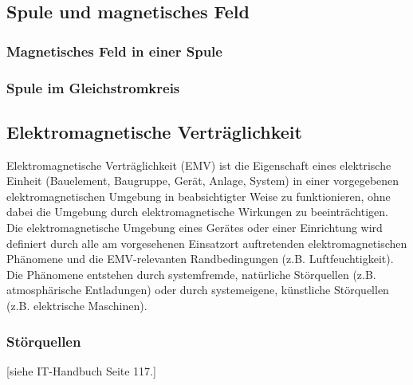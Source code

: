 \subsection{Spule und magnetisches Feld}
\subsubsection{Magnetisches Feld in einer Spule}
\subsubsection{Spule im Gleichstromkreis}

\subsection{Elektromagnetische Verträglichkeit}

Elektromagnetische Verträglichkeit (EMV) ist die Eigenschaft eines elektrische Einheit (Bauelement, Baugruppe, Gerät, Anlage, System) in einer vorgegebenen elektromagnetischen Umgebung in beabsichtigter Weise zu funktionieren, ohne dabei die Umgebung durch elektromagnetische Wirkungen zu beeinträchtigen. Die elektromagnetische Umgebung eines Gerätes oder einer Einrichtung wird definiert durch alle am vorgesehenen Einsatzort auftretenden elektromagnetischen Phänomene und die EMV-relevanten Randbedingungen (z.B. Luftfeuchtigkeit). Die Phänomene entstehen durch systemfremde, natürliche Störquellen (z.B. atmosphärische Entladungen) oder durch systemeigene, künstliche Störquellen (z.B. elektrische Maschinen).

\subsubsection{Störquellen}

[siehe IT-Handbuch Seite 117.]

